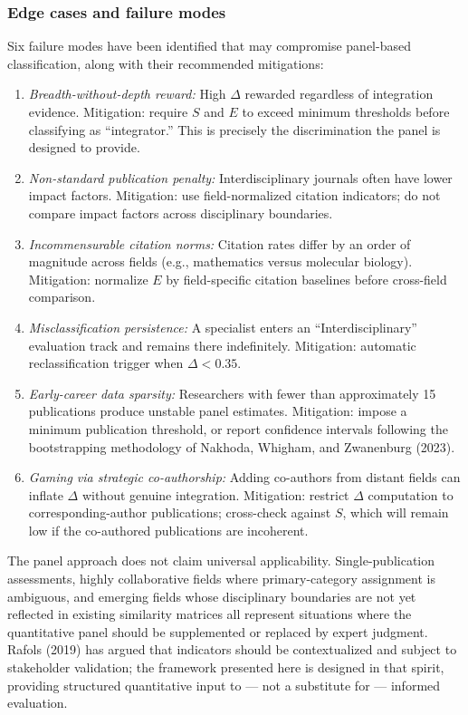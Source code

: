 \documentclass[
]{article}
\begin{document}
\hypertarget{edge-cases-and-failure-modes}{%
\subsubsection{Edge cases and failure
modes}\label{edge-cases-and-failure-modes}}

Six failure modes have been identified that may compromise panel-based
classification, along with their recommended mitigations:

\begin{enumerate}
\def\labelenumi{\arabic{enumi}.}
\item
  \emph{Breadth-without-depth reward:} High \(\Delta\) rewarded
  regardless of integration evidence. Mitigation: require \(S\) and
  \(E\) to exceed minimum thresholds before classifying as
  ``integrator.'' This is precisely the discrimination the panel is
  designed to provide.
\item
  \emph{Non-standard publication penalty:} Interdisciplinary journals
  often have lower impact factors. Mitigation: use field-normalized
  citation indicators; do not compare impact factors across disciplinary
  boundaries.
\item
  \emph{Incommensurable citation norms:} Citation rates differ by an
  order of magnitude across fields (e.g., mathematics versus molecular
  biology). Mitigation: normalize \(E\) by field-specific citation
  baselines before cross-field comparison.
\item
  \emph{Misclassification persistence:} A specialist enters an
  ``Interdisciplinary'' evaluation track and remains there indefinitely.
  Mitigation: automatic reclassification trigger when \(\Delta < 0.35\).
\item
  \emph{Early-career data sparsity:} Researchers with fewer than
  approximately 15 publications produce unstable panel estimates.
  Mitigation: impose a minimum publication threshold, or report
  confidence intervals following the bootstrapping methodology of
  Nakhoda, Whigham, and Zwanenburg (2023).
\item
  \emph{Gaming via strategic co-authorship:} Adding co-authors from
  distant fields can inflate \(\Delta\) without genuine integration.
  Mitigation: restrict \(\Delta\) computation to corresponding-author
  publications; cross-check against \(S\), which will remain low if the
  co-authored publications are incoherent.
\end{enumerate}

The panel approach does not claim universal applicability.
Single-publication assessments, highly collaborative fields where
primary-category assignment is ambiguous, and emerging fields whose
disciplinary boundaries are not yet reflected in existing similarity
matrices all represent situations where the quantitative panel should be
supplemented or replaced by expert judgment. Rafols (2019) has argued
that indicators should be contextualized and subject to stakeholder
validation; the framework presented here is designed in that spirit,
providing structured quantitative input to --- not a substitute for ---
informed evaluation.
\end{document}
